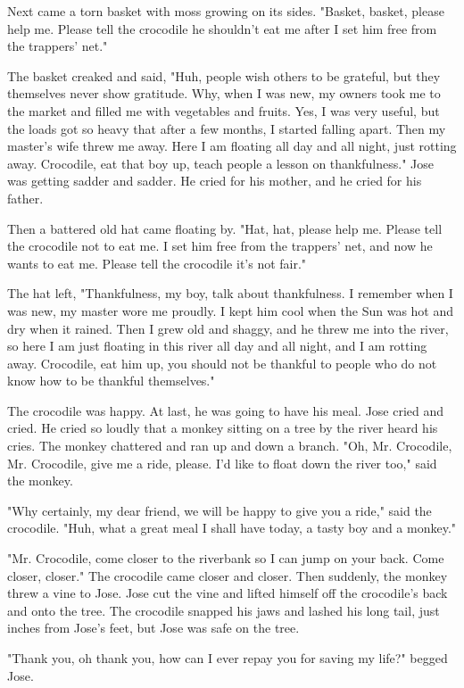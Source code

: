 Next came a torn basket with moss growing on its sides. "Basket, basket, please help me. Please tell the crocodile he shouldn't eat me after I set him free from the trappers' net."

The basket creaked and said, "Huh, people wish others to be grateful, but they themselves never show gratitude. Why, when I was new, my owners took me to the market and filled me with vegetables and fruits. Yes, I was very useful, but the loads got so heavy that after a few months, I started falling apart. Then my master's wife threw me away. Here I am floating all day and all night, just rotting away. Crocodile, eat that boy up, teach people a lesson on thankfulness." Jose was getting sadder and sadder. He cried for his mother, and he cried for his father.

Then a battered old hat came floating by. "Hat, hat, please help me. Please tell the crocodile not to eat me. I set him free from the trappers' net, and now he wants to eat me. Please tell the crocodile it's not fair."

The hat left, "Thankfulness, my boy, talk about thankfulness. I remember when I was new, my master wore me proudly. I kept him cool when the Sun was hot and dry when it rained. Then I grew old and shaggy, and he threw me into the river, so here I am just floating in this river all day and all night, and I am rotting away. Crocodile, eat him up, you should not be thankful to people who do not know how to be thankful themselves."

The crocodile was happy. At last, he was going to have his meal. Jose cried and cried. He cried so loudly that a monkey sitting on a tree by the river heard his cries. The monkey chattered and ran up and down a branch. "Oh, Mr. Crocodile, Mr. Crocodile, give me a ride, please. I'd like to float down the river too," said the monkey.

"Why certainly, my dear friend, we will be happy to give you a ride," said the crocodile. "Huh, what a great meal I shall have today, a tasty boy and a monkey."

"Mr. Crocodile, come closer to the riverbank so I can jump on your back. Come closer, closer." The crocodile came closer and closer. Then suddenly, the monkey threw a vine to Jose. Jose cut the vine and lifted himself off the crocodile's back and onto the tree. The crocodile snapped his jaws and lashed his long tail, just inches from Jose's feet, but Jose was safe on the tree.

"Thank you, oh thank you, how can I ever repay you for saving my life?" begged Jose.

